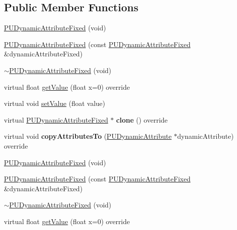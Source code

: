 \subsection*{Public Member Functions}
\begin{DoxyCompactItemize}
\item 
\hyperlink{classPUDynamicAttributeFixed_a577697353325d80fe176bf309b33e4b2}{P\+U\+Dynamic\+Attribute\+Fixed} (void)
\item 
\hyperlink{classPUDynamicAttributeFixed_a4705fa94353f186ea52aa6a1183e9635}{P\+U\+Dynamic\+Attribute\+Fixed} (const \hyperlink{classPUDynamicAttributeFixed}{P\+U\+Dynamic\+Attribute\+Fixed} \&dynamic\+Attribute\+Fixed)
\item 
\hyperlink{classPUDynamicAttributeFixed_a80fa3c4db1f9e8404eb1680715ca801e}{$\sim$\+P\+U\+Dynamic\+Attribute\+Fixed} (void)
\item 
virtual float \hyperlink{classPUDynamicAttributeFixed_ae4915a880ce125cbd5b123bba2966601}{get\+Value} (float x=0) override
\item 
virtual void \hyperlink{classPUDynamicAttributeFixed_a0b17d7e1e5d511153ff58714f300921e}{set\+Value} (float value)
\item 
\mbox{\label{classPUDynamicAttributeFixed_afb21a7a35af7efbe18f05b4d263b449a}} 
virtual \hyperlink{classPUDynamicAttributeFixed}{P\+U\+Dynamic\+Attribute\+Fixed} $\ast$ {\bfseries clone} () override
\item 
\mbox{\label{classPUDynamicAttributeFixed_a781da90156c00667b5c6a4cd615ed4a3}} 
virtual void {\bfseries copy\+Attributes\+To} (\hyperlink{classPUDynamicAttribute}{P\+U\+Dynamic\+Attribute} $\ast$dynamic\+Attribute) override
\item 
\hyperlink{classPUDynamicAttributeFixed_a577697353325d80fe176bf309b33e4b2}{P\+U\+Dynamic\+Attribute\+Fixed} (void)
\item 
\hyperlink{classPUDynamicAttributeFixed_a4705fa94353f186ea52aa6a1183e9635}{P\+U\+Dynamic\+Attribute\+Fixed} (const \hyperlink{classPUDynamicAttributeFixed}{P\+U\+Dynamic\+Attribute\+Fixed} \&dynamic\+Attribute\+Fixed)
\item 
\hyperlink{classPUDynamicAttributeFixed_a80fa3c4db1f9e8404eb1680715ca801e}{$\sim$\+P\+U\+Dynamic\+Attribute\+Fixed} (void)
\item 
virtual float \hyperlink{classPUDynamicAttributeFixed_a154eea66dacfa4c1c4c2087b84261c18}{get\+Value} (float x=0) override

\end{DoxyCompactItemize}
